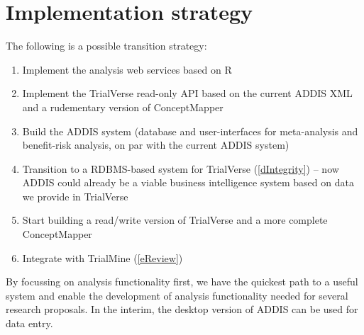 \documentclass[a4paper]{article}
\begin{document}
\section{Implementation strategy}
The following is a possible transition strategy:
\begin{enumerate}
\item Implement the analysis web services based on R
\item Implement the TrialVerse read-only API based on the current ADDIS XML and a rudementary version of ConceptMapper
\item Build the ADDIS system (database and user-interfaces for meta-analysis and benefit-risk analysis, on par with the current ADDIS system)
\item Transition to a RDBMS-based system for TrialVerse (\ref{dIntegrity}) -- now ADDIS could already be a viable business intelligence system based on data we provide in TrialVerse
\item Start building a read/write version of TrialVerse and a more complete ConceptMapper
\item Integrate with TrialMine (\ref{eReview})
\end{enumerate}
By focussing on analysis functionality first, we have the quickest path to a useful system and enable the development of analysis functionality needed for several research proposals.
In the interim, the desktop version of ADDIS can be used for data entry.
\end{document}
